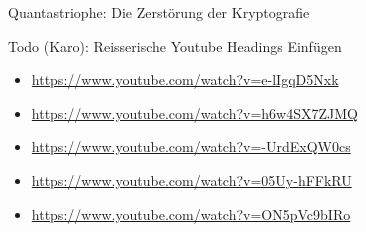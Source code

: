 
\begin{frame}[T]{Quantastriophe: Die Zerstörung der Kryptografie}


Todo (Karo): Reisserische Youtube Headings Einfügen

\begin{itemize}
  \item \url{https://www.youtube.com/watch?v=e-lIgqD5Nxk}
  \item \url{https://www.youtube.com/watch?v=h6w4SX7ZJMQ}
  \item \url{https://www.youtube.com/watch?v=-UrdExQW0cs}
  \item \url{https://www.youtube.com/watch?v=05Uy-hFFkRU}
  \item \url{https://www.youtube.com/watch?v=ON5pVc9bIRo}
\end{itemize}

\end{frame}




